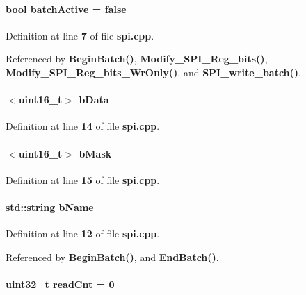 \paragraph[{batch\+Active}]{\setlength{\rightskip}{0pt plus 5cm}bool batch\+Active = false}\label{spi_8cpp_ab37716ab32304630d6174a2666f40fd3}


Definition at line {\bf 7} of file {\bf spi.\+cpp}.



Referenced by {\bf Begin\+Batch()}, {\bf Modify\+\_\+\+S\+P\+I\+\_\+\+Reg\+\_\+bits()}, {\bf Modify\+\_\+\+S\+P\+I\+\_\+\+Reg\+\_\+bits\+\_\+\+Wr\+Only()}, and {\bf S\+P\+I\+\_\+write\+\_\+batch()}.

\paragraph[{b\+Data}]{$<$uint16\+\_\+t$>$ b\+Data}\label{spi_8cpp_a3683dd44d05092af9d46b8e58042498b}


Definition at line {\bf 14} of file {\bf spi.\+cpp}.

\paragraph[{b\+Mask}]{$<$uint16\+\_\+t$>$ b\+Mask}\label{spi_8cpp_a6a066d765bf05ceff2f022984ba19843}


Definition at line {\bf 15} of file {\bf spi.\+cpp}.

\paragraph[{b\+Name}]{\setlength{\rightskip}{0pt plus 5cm}std\+::string b\+Name}\label{spi_8cpp_af87b39d2cc0803a9cfa7cee57cf2ba00}


Definition at line {\bf 12} of file {\bf spi.\+cpp}.



Referenced by {\bf Begin\+Batch()}, and {\bf End\+Batch()}.

\paragraph[{read\+Cnt}]{\setlength{\rightskip}{0pt plus 5cm}uint32\+\_\+t read\+Cnt = 0}\label{spi_8cpp_a95e234fef53b4cfdb73195aa20ae4109}


